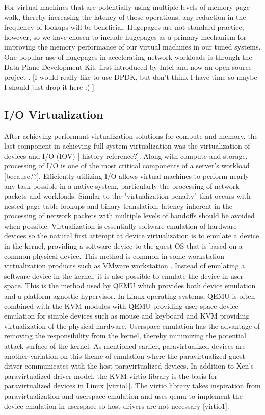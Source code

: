 For virtual machines that are potentially using multiple levels of memory page walk, thereby increasing the latency of those operations, any reduction in the frequency of lookups will be beneficial.  Hugepages are not standard practice, however, so we have chosen to include hugepages as a primary mechanism for improving the memory performance of our virtual machines in our tuned systems.  
One popular use of hugepages in accelerating network workloads is through the Data Plane Development Kit, first introduced by Intel and now an open source project \autocite{_dpdk_1}.  [I would really like to use DPDK, but don't think I have time so maybe I should just drop it here :( ]

\subsection{I/O Virtualization}
\label{sec:vt_io}
After achieving performant virtualization solutions for compute and memory, the last component in achieving full system virtualization was the virtualization of devices and I/O (IOV) [ history reference?].   Along with compute and storage, processing of I/O is one of the most critical components of a server's workload [because??].  Efficiently utilizing I/O allows virtual machines to perform nearly any task possible in a native system, particularly the processing of network packets and workloads.  Similar to the "virtualization penalty" that occurs with nested page table lookups and binary translation, latency inherent in the processing of network packets with multiple levels of handoffs should be avoided when possible.  
Virtualization is essentially software emulation of hardware devices so the natural first attempt at device virtualization is to emulate a device in the kernel, providing a software device to the guest OS that is based on a common physical device.  This method is common in some workstation virtualization products such as VMware workstation \autocite{_jones_1}.  Instead of emulating a software device in the kernel, it is also possible to emulate the device in user-space.  This is the method used by QEMU which provides both device emulation and a platform-agnostic hypervisor.  In Linux operating systems, QEMU is often combined with the KVM modules with QEMU providing user-space device emulation for simple devices such as mouse and keyboard and KVM providing virtualization of the physical hardware.  Userspace emulation has the advantage of removing the responsibility from the kernel, thereby minimizing the potential attack surface of the kernel.  As mentioned earlier, paravirtualized devices are another variation on this theme of emulation where the paravirtualized guest driver communicates with the host paravirtualized devices.  In addition to Xen's paravirtualized driver model, the KVM virtio library is the basis for paravirtualized devices in Linux [virtio1].  The virtio library takes inspiration from paravirtualization and userspace emulation and uses qemu to implement the device emulation in userspace so host drivers are not necessary [virtio1].      
